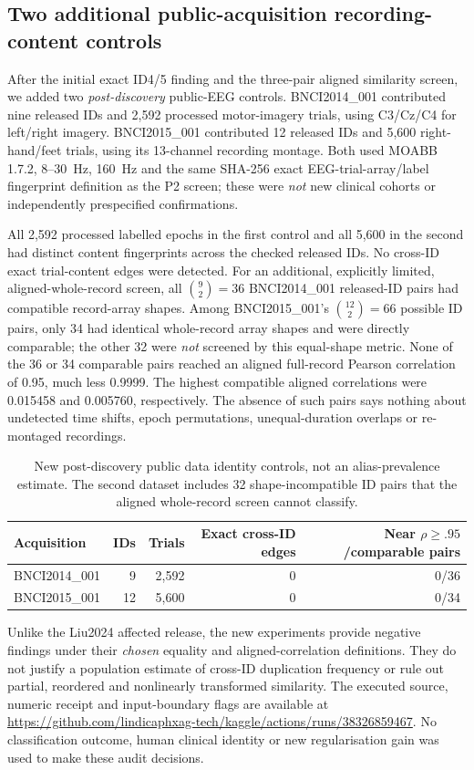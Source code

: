 \subsection{Two additional public-acquisition recording-content controls}
\label{sec:p2-two-additional-controls}
After the initial exact ID4/5 finding and the
three-pair aligned similarity screen, we
added two \emph{post-discovery} public-EEG
controls. BNCI2014\_001 contributed nine
released IDs and 2,592 processed motor-imagery
trials, using C3/Cz/C4 for left/right imagery.
BNCI2015\_001 contributed 12 released IDs
and 5,600 right-hand/feet trials, using its
13-channel recording montage. Both used
MOABB 1.7.2, 8--30~Hz, 160~Hz and the
same SHA-256 exact EEG-trial-array/label
fingerprint definition as the P2 screen;
these were \emph{not} new clinical cohorts
or independently prespecified confirmations.

All 2,592 processed labelled epochs in the
first control and all 5,600 in the second
had distinct content fingerprints across
the checked released IDs. No cross-ID
exact trial-content edges were detected.
For an additional, explicitly limited,
aligned-whole-record screen, all
$\binom92=36$ BNCI2014\_001 released-ID
pairs had compatible record-array shapes.
Among BNCI2015\_001's
$\binom{12}{2}=66$ possible ID pairs,
only 34 had identical whole-record array
shapes and were directly comparable;
the other 32 were \emph{not} screened by
this equal-shape metric. None of the 36
or 34 comparable pairs reached an
aligned full-record Pearson correlation
of 0.95, much less 0.9999.
The highest compatible aligned correlations
were 0.015458 and 0.005760,
respectively. The absence of such
pairs says nothing about undetected time
shifts, epoch permutations, unequal-duration
overlaps or re-montaged recordings.

\begin{table}[h!]
\centering\small
\caption{New post-discovery public data
identity controls, not an alias-prevalence
estimate. The second dataset includes
32 shape-incompatible ID pairs that the
aligned whole-record screen cannot classify.}
\label{tab:p2-added-controls}
\begin{tabular}{lrrrr}
\toprule
Acquisition & IDs & Trials & Exact cross-ID edges & Near $\rho\geq .95$/comparable pairs\\
\midrule
BNCI2014\_001 & 9 & 2,592 & 0 & 0/36\\
BNCI2015\_001 & 12 & 5,600 & 0 & 0/34\\
\bottomrule
\end{tabular}
\end{table}
Unlike the Liu2024 affected release, the
new experiments provide negative findings
under their \emph{chosen} equality and
aligned-correlation definitions. They do
not justify a population estimate of
cross-ID duplication frequency or
rule out partial, reordered and
nonlinearly transformed similarity.
The executed source, numeric receipt and
input-boundary flags are available at
\url{https://github.com/lindicaphxag-tech/kaggle/actions/runs/38326859467}.
No classification outcome, human clinical
identity or new regularisation gain
was used to make these audit decisions.
